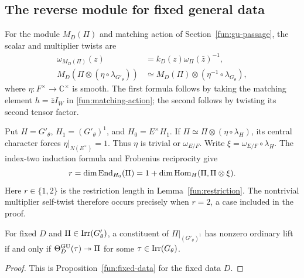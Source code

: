 \subsection{The reverse module for fixed general data}
For the module $M_D(\Pi)$ and matching action of
Section~\ref{fun:gu-passage}, the scalar and multiplier twists are
\begin{align}
 \omega_{M_D(\Pi)}(z)&=k_D(z)\omega_\Pi(\bar z)^{-1},\\
 M_D(\Pi\otimes(\eta\circ\lambda_{G'_\theta}))
 &\simeq M_D(\Pi)\otimes(\eta^{-1}\circ\lambda_{G_\theta}),
 \label{gu:asm:multiplier-twist}
\end{align}
where $\eta:F^\times\to\mathbb C^\times$ is smooth.
The first formula follows by taking the matching element
$h=\bar zI_W$ in \eqref{fun:matching-action}; the second follows by
twisting its second tensor factor.

Put $H=G'_\theta$, $H_1=(G'_\theta)^1$, and $H_0=E^\times H_1$.
If $\Pi\simeq\Pi\otimes(\eta\circ\lambda_H)$,
its central character forces $\eta|_{N(E^\times)}=1$. Thus $\eta$
is trivial or $\omega_{E/F}$. Write $\xi=\omega_{E/F}\circ\lambda_H$.
The index-two induction formula and Frobenius reciprocity give
\[
 r=\dim\operatorname{End}_{H_0}(\Pi)
   =1+\dim\operatorname{Hom}_H(\Pi,\Pi\otimes\xi).
\]
Here $r\in\{1,2\}$ is the restriction length in
Lemma~\ref{fun:restriction}. The nontrivial multiplier self-twist
therefore occurs precisely when $r=2$, a case included in the proof.

\begin{corollary}\label{gu:app:general-assembly}
For fixed $D$ and $\Pi\in\operatorname{Irr}(G'_\theta)$, a constituent of
$\Pi|_{(G'_\theta)^1}$ has nonzero ordinary lift if and only if
$\Theta_D^{\operatorname{GU}}(\tau)\twoheadrightarrow\Pi$ for some
$\tau\in\operatorname{Irr}(G_\theta)$.
\end{corollary}
\begin{proof}
This is Proposition~\ref{fun:fixed-data} for the fixed data $D$.
\end{proof}
